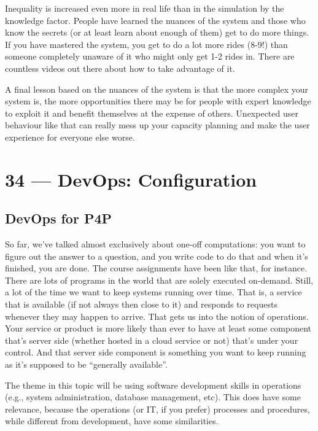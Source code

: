 \documentclass[a4paper]{report}
\begin{document}
Inequality is increased even more in real life than in the simulation by the knowledge factor. People have learned the nuances of the system and those who know the secrets (or at least learn about enough of them) get to do more things. If you have mastered the system, you get to do a lot more rides (8-9!) than someone completely unaware of it who might only get 1-2 rides in. There are countless videos out there about how to take advantage of it.

A final lesson based on the nuances of the system is that the more complex your system is, the more opportunities there may be for people with expert knowledge to exploit it and benefit themselves at the expense of others. Unexpected user behaviour like that can really mess up your capacity planning and make the user experience for everyone else worse. 









\chapter*{34 --- DevOps: Configuration}


\section*{DevOps for P4P}
So far, we've talked almost exclusively about one-off computations:
you want to figure out the answer to a question, and you write code to
do that and when it's finished, you are done. 
The course assignments have been like that, for instance. There are lots
of programs in the world that are solely executed on-demand. Still, a lot
of the time we want to keep systems running over time. That is, a service
that is available (if not always then close to it) and responds to requests
whenever they may happen to arrive. That gets us
into the notion of operations. Your service or product is more likely than 
ever to have at least some component that's server side (whether hosted
in a cloud service or not) that's under your control. And that server side
component is something you want to keep running as it's supposed to be 
``generally available''.

The theme in this topic will be using software development skills in
operations (e.g., system administration, database management, etc). This
does have some relevance, because the operations (or IT, if you prefer)
processes and procedures, while different from development, have some
similarities. 
\end{document}
